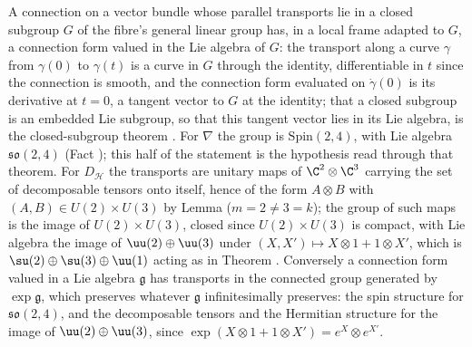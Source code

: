 A connection on a vector bundle whose parallel transports lie in a closed subgroup $G$ of the fibre's general linear group has, in a local frame adapted to $G$, a connection form valued in the Lie algebra of $G$: the transport along a curve $\gamma$ from $\gamma(0)$ to $\gamma(t)$ is a curve in $G$ through the identity, differentiable in $t$ since the connection is smooth, and the connection form evaluated on $\dot\gamma(0)$ is its derivative at $t = 0$, a tangent vector to $G$ at the identity; that a closed subgroup is an embedded Lie subgroup, so that this tangent vector lies in its Lie algebra, is the closed-subgroup theorem \cite[Thm.~20.12]{Lee2013}. For $\nabla$ the group is $\mathrm{Spin}(2,4)$, with Lie algebra $\mathfrak{so}(2,4)$ (Fact ); this half of the statement is the hypothesis read through that theorem. For $D_{\mathcal{H}}$ the transports are unitary maps of $\C^{2} \otimes \C^{3}$ carrying the set of decomposable tensors onto itself, hence of the form $A \otimes B$ with $(A, B) \in U(2) \times U(3)$ by Lemma  ($m = 2 \neq 3 = k$); the group of such maps is the image of $U(2) \times U(3)$, closed since $U(2) \times U(3)$ is compact, with Lie algebra the image of $\uu(2) \oplus \uu(3)$ under $(X, X') \mapsto X \otimes 1 + 1 \otimes X'$, which is $\su(2) \oplus \su(3) \oplus \uu(1)$ acting as in Theorem . Conversely a connection form valued in a Lie algebra $\mathfrak{g}$ has transports in the connected group generated by $\exp\mathfrak{g}$, which preserves whatever $\mathfrak{g}$ infinitesimally preserves: the spin structure for $\mathfrak{so}(2,4)$, and the decomposable tensors and the Hermitian structure for the image of $\uu(2) \oplus \uu(3)$, since $\exp(X \otimes 1 + 1 \otimes X') = e^{X} \otimes e^{X'}$.
